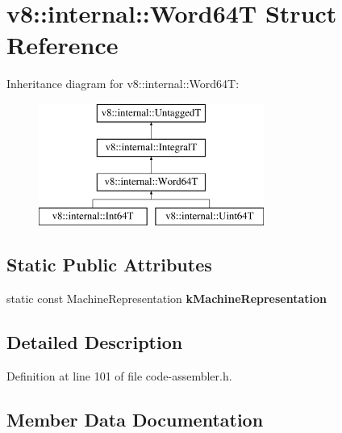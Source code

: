 \hypertarget{structv8_1_1internal_1_1Word64T}{}\section{v8\+:\+:internal\+:\+:Word64T Struct Reference}
\label{structv8_1_1internal_1_1Word64T}
Inheritance diagram for v8\+:\+:internal\+:\+:Word64T\+:\begin{figure}[H]
\begin{center}
\leavevmode
\includegraphics[height=4.000000cm]{structv8_1_1internal_1_1Word64T}
\end{center}
\end{figure}
\subsection*{Static Public Attributes}
\begin{DoxyCompactItemize}
\item 
static const Machine\+Representation {\bfseries k\+Machine\+Representation}
\end{DoxyCompactItemize}


\subsection{Detailed Description}


Definition at line 101 of file code-\/assembler.\+h.



\subsection{Member Data Documentation}
\mbox{\label{structv8_1_1internal_1_1Word64T_a33e20174ab81fdf590441e67fa0df567}} 
